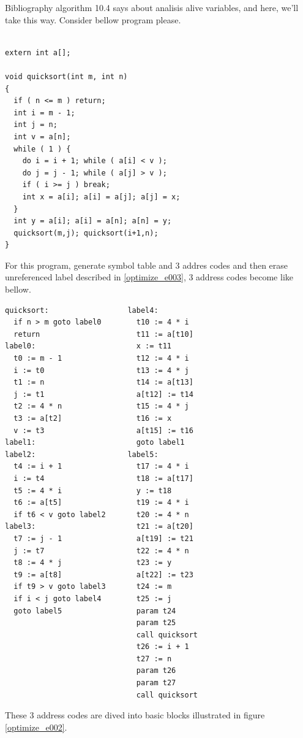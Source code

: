 Bibliography \cite{doragon} algorithm 10.4 says about 
analisis alive variables, and here, we'll take this way.
Consider bellow program please.
\begin{verbatim}

extern int a[];

void quicksort(int m, int n)
{
  if ( n <= m ) return;
  int i = m - 1;
  int j = n;
  int v = a[n];
  while ( 1 ) {
    do i = i + 1; while ( a[i] < v );
    do j = j - 1; while ( a[j] > v );
    if ( i >= j ) break;
    int x = a[i]; a[i] = a[j]; a[j] = x;
  }
  int y = a[i]; a[i] = a[n]; a[n] = y;
  quicksort(m,j); quicksort(i+1,n);
}
\end{verbatim}
For this program, generate symbol table and 3 addres codes
and then erase unreferenced label described in \ref{optimize_e003},
3 address codes become like bellow.
\begin{verbatim}
quicksort:                  label4:
  if n > m goto label0        t10 := 4 * i
  return                      t11 := a[t10]
label0:                       x := t11
  t0 := m - 1                 t12 := 4 * i
  i := t0                     t13 := 4 * j
  t1 := n                     t14 := a[t13]
  j := t1                     a[t12] := t14
  t2 := 4 * n                 t15 := 4 * j
  t3 := a[t2]                 t16 := x
  v := t3                     a[t15] := t16
label1:                       goto label1
label2:                     label5:
  t4 := i + 1                 t17 := 4 * i
  i := t4                     t18 := a[t17]
  t5 := 4 * i                 y := t18
  t6 := a[t5]                 t19 := 4 * i
  if t6 < v goto label2       t20 := 4 * n
label3:                       t21 := a[t20]
  t7 := j - 1                 a[t19] := t21
  j := t7                     t22 := 4 * n
  t8 := 4 * j                 t23 := y
  t9 := a[t8]                 a[t22] := t23
  if t9 > v goto label3       t24 := m
  if i < j goto label4        t25 := j
  goto label5                 param t24
                              param t25
                              call quicksort
                              t26 := i + 1
                              t27 := n
                              param t26
                              param t27
                              call quicksort
\end{verbatim}
These 3 address codes are dived into basic blocks illustrated in
figure \ref{optimize_e002}.
